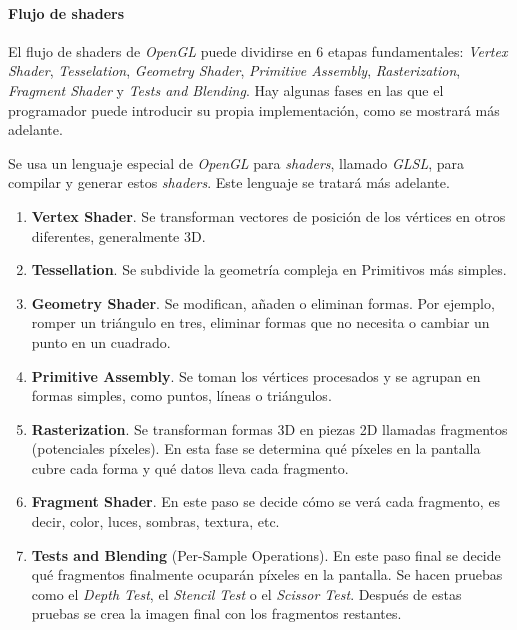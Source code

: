 



\FloatBarrier
\paragraph{Flujo de shaders} \label{par:ogl-shader-flow}

El flujo de shaders \cite{webOGLShaderPipe} de \textit{OpenGL} puede dividirse en 6 etapas fundamentales: \textit{Vertex Shader}, \textit{Tesselation}, \textit{Geometry Shader}, \textit{Primitive Assembly}, \textit{Rasterization}, \textit{Fragment Shader} y \textit{Tests and Blending}. Hay algunas fases en las que el programador puede introducir su propia implementación, como se mostrará más adelante.

Se usa un lenguaje especial de \textit{OpenGL} para \textit{shaders}, llamado \textit{GLSL}, para compilar y generar estos \textit{shaders}. Este lenguaje se tratará más adelante.

\begin{enumerate}
    \item \textbf{Vertex Shader}. Se transforman vectores de posición de los vértices en otros diferentes, generalmente 3D.
    
    \item \textbf{Tessellation}. Se subdivide la geometría compleja en Primitivos más simples.
    
    \item \textbf{Geometry Shader}. Se modifican, añaden o eliminan formas. Por ejemplo, romper un triángulo en tres, eliminar formas que no necesita o cambiar un punto en un cuadrado.
    
    \item \textbf{Primitive Assembly}. Se toman los vértices procesados y se agrupan en formas simples, como puntos, líneas o triángulos.
    
    \item \textbf{Rasterization}. Se transforman formas 3D en piezas 2D llamadas fragmentos (potenciales píxeles). En esta fase se determina qué píxeles en la pantalla cubre cada forma y qué datos lleva cada fragmento.
    
    \item \textbf{Fragment Shader}. En este paso se decide cómo se verá cada fragmento, es decir, color, luces, sombras, textura, etc.
    
    \item \textbf{Tests and Blending} (Per-Sample Operations). En este paso final se decide qué fragmentos finalmente ocuparán píxeles en la pantalla. Se hacen pruebas como el \textit{Depth Test}, el \textit{Stencil Test} o el \textit{Scissor Test}. Después de estas pruebas se crea la imagen final con los fragmentos restantes.

\end{enumerate}

